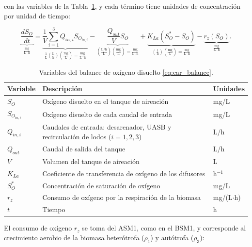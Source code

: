 con las variables de la Tabla~\ref{tab:car_variables}, y cada término tiene unidades de concentración
por unidad de tiempo:

\begin{equation}
\underbrace{\frac{dS_O}{dt}}_{\frac{\mathrm{mg}}{\mathrm{L}\cdot\mathrm{h}}}
=
\underbrace{\frac{1}{V}\sum_{i=1}^3 Q_{in,i}S_{O_{in,i}}}_{\frac{1}{\mathrm{L}}
\left(\frac{\mathrm{L}}{\mathrm{h}}\right)
\left(\frac{\mathrm{mg}}{\mathrm{L}}\right)
=
\frac{\mathrm{mg}}{\mathrm{L}\cdot\mathrm{h}}}
-
\underbrace{\frac{Q_{out}}{V}S_O}_{\left(\frac{\mathrm{L}/\mathrm{h}}{\mathrm{L}}\right)
\left(\frac{\mathrm{mg}}{\mathrm{L}}\right)
=
\frac{\mathrm{mg}}{\mathrm{L}\cdot\mathrm{h}}}
+
\underbrace{K_{La}(S^{*}_O-S_O)}_{\left(\frac{1}{\mathrm{h}}\right)
\left(\frac{\mathrm{mg}}{\mathrm{L}}\right)
=
\frac{\mathrm{mg}}{\mathrm{L}\cdot\mathrm{h}}}
-
\underbrace{r_z(S_O)}_{\frac{\mathrm{mg}}{\mathrm{L}\cdot\mathrm{h}}}.
\label{ecu:nonlineal}
\end{equation}

\begin{table}[H]
\centering
\caption{Variables del balance de oxígeno disuelto \eqref{eq:car_balance}.}
\label{tab:car_variables}
\renewcommand{\arraystretch}{1.2}
\small
\begin{tabular}{@{}l>{\raggedright\arraybackslash}p{9.2cm}l@{}}
\toprule
\textbf{Variable} & \textbf{Descripción} & \textbf{Unidades} \\
\midrule
$S_O$ & Oxígeno disuelto en el tanque de aireación & mg/L \\
$S_{O_{in,i}}$ & Oxígeno disuelto de cada caudal de entrada & mg/L \\
$Q_{in,i}$ & Caudales de entrada: desarenador, UASB y recirculación de lodos ($i = 1, 2, 3$) & L/h \\
$Q_{out}$ & Caudal de salida del tanque & L/h \\
$V$ & Volumen del tanque de aireación & L \\
$K_{La}$ & Coeficiente de transferencia de oxígeno de los difusores & h$^{-1}$ \\
$S^{*}_O$ & Concentración de saturación de oxígeno & mg/L \\
$r_z$ & Consumo de oxígeno por la respiración de la biomasa & mg/(L$\cdot$h) \\
$t$ & Tiempo & h \\
\bottomrule
\end{tabular}
\end{table}

El consumo de oxígeno $r_z$ se toma del ASM1, como en el
BSM1, y corresponde al crecimiento aerobio de la biomasa heterótrofa
($\rho_1$) y autótrofa ($\rho_3$):

